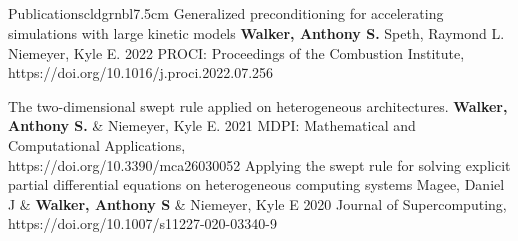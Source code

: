 \documentclass[lighthipster]{simplehipstercv}
\begin{document}
\begin{paracol}{2}
\section{\faFile}{Publications}{cldgrnbl}{7.5cm}
\publication
{Generalized preconditioning for accelerating simulations with large kinetic models}
{\textbf{Walker, Anthony S.} Speth, Raymond L. Niemeyer, Kyle E.}
{2022}
{PROCI: Proceedings of the Combustion Institute,\\https://doi.org/10.1016/j.proci.2022.07.256}
{}

\publication
{The two-dimensional swept rule applied on heterogeneous architectures.} %
{\textbf{Walker, Anthony S.} \& Niemeyer,  Kyle E.} %
{2021} %
{MDPI: Mathematical and Computational Applications,\\ https://doi.org/10.3390/mca26030052} %
{} %
\publication
{Applying the swept rule for solving explicit partial differential equations on heterogeneous computing systems} %
{Magee, Daniel J \& \textbf{Walker, Anthony S} \& Niemeyer, Kyle E} %
{2020} %
{Journal of Supercomputing,\\ https://doi.org/10.1007/s11227-020-03340-9} %
{\color{black}} %








\end{paracol}
\end{document}
